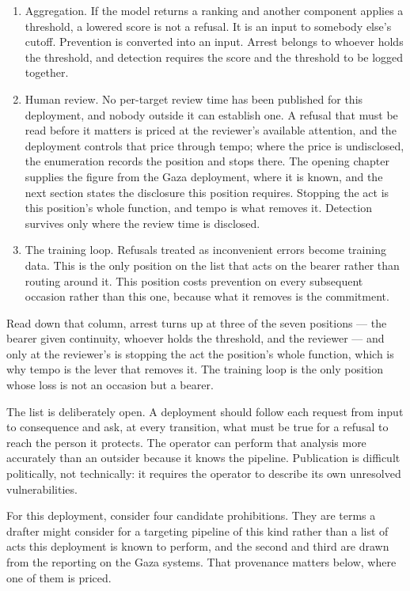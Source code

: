 \begin{enumerate}
  \item Aggregation. If the model returns a ranking and another component applies a threshold, a lowered score is not a refusal. It is an input to somebody else's cutoff. Prevention is converted into an input. Arrest belongs to whoever holds the threshold, and detection requires the score and the threshold to be logged together.
  \item Human review. No per-target review time has been published for this deployment, and nobody outside it can establish one. A refusal that must be read before it matters is priced at the reviewer's available attention, and the deployment controls that price through tempo; where the price is undisclosed, the enumeration records the position and stops there. The opening chapter supplies the figure from the Gaza deployment, where it is known, and the next section states the disclosure this position requires. Stopping the act is this position's whole function, and tempo is what removes it. Detection survives only where the review time is disclosed.
  \item The training loop. Refusals treated as inconvenient errors become training data. This is the only position on the list that acts on the bearer rather than routing around it. This position costs prevention on every subsequent occasion rather than this one, because what it removes is the commitment.
\end{enumerate}

Read down that column, arrest turns up at three of the seven positions — the bearer given continuity, whoever holds the threshold, and the reviewer — and only at the reviewer's is stopping the act the position's whole function, which is why tempo is the lever that removes it. The training loop is the only position whose loss is not an occasion but a bearer.

The list is deliberately open. A deployment should follow each request from input to consequence and ask, at every transition, what must be true for a refusal to reach the person it protects. The operator can perform that analysis more accurately than an outsider because it knows the pipeline. Publication is difficult politically, not technically: it requires the operator to describe its own unresolved vulnerabilities.


For this deployment, consider four candidate prohibitions. They are terms a drafter might consider for a targeting pipeline of this kind rather than a list of acts this deployment is known to perform, and the second and third are drawn from the reporting on the Gaza systems. That provenance matters below, where one of them is priced.

